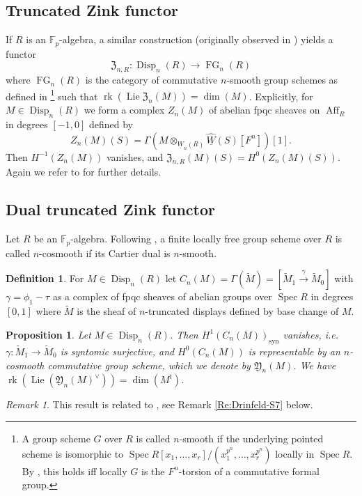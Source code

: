 \documentclass[a4paper,11pt]{amsart}
\theoremstyle{plain}
\newtheorem{Prop}[equation]{Proposition}
\theoremstyle{definition}
\newtheorem{Defn}[equation]{Definition}
\theoremstyle{remark}
\newtheorem{Remark}[equation]{Remark}
\newcommand{\bPr}{\begin{Prop}}
\newcommand{\ePr}{\end{Prop}}
\newcommand{\bDe}{\begin{Defn}}
\newcommand{\eDe}{\end{Defn}}
\newcommand{\bRe}{\begin{Remark}}
\newcommand{\eRe}{\end{Remark}}
\newcommand{\beqn}{\begin{equation}}
\newcommand{\eeqn}{\end{equation}}
\renewcommand{\u}{\underline}
\newcommand{\uM}{M} %
\numberwithin{equation}{section}
\newcommand{\FY}{\mathfrak{Y}}
\newcommand{\FZ}{\mathfrak{Z}}
\newcommand{\FF}{{\mathbb{F}}}
\DeclareMathOperator{\rk}{rk}
\DeclareMathOperator{\syn}{syn}
\DeclareMathOperator{\Aff}{Aff}
\DeclareMathOperator{\Disp}{Disp}
\DeclareMathOperator{\FG}{FG}
\DeclareMathOperator{\Lie}{Lie}
\DeclareMathOperator{\Spec}{Spec}
\begin{document}
\subsection{Truncated Zink functor}
\label{Se:Truncated-Zink-functor}

If $R$ is an $\FF_p$-algebra, a similar construction (originally observed in \cite{Lau-Zink}) yields a functor
\beqn
\label{Eq:FZnR-DispnR-LGnR}
\FZ_{n,R}\colon \Disp_n(R)\to\FG_n(R)
\eeqn
where $\FG_n(R)$ is the category of commutative $n$-smooth group schemes as defined in \cite{Drinfeld:The-Lau}\footnote{A group scheme $G$ over $R$ is called $n$-smooth if the underlying pointed scheme is isomorphic to $\Spec R[x_1,\ldots,x_r]/(x_1^{p^n},\ldots,x_r^{p^n})$ locally in $\Spec R$. By \cite[Theorem~A \& Proposition~4.3.3]{Kothari-Mundinger}, this holds iff locally $G$ is the $F^n$-torsion of a commutative formal group.} such that $\rk(\Lie\FZ_n(\uM))=\dim(\uM)$. Explicitly, for $\uM\in\Disp_n(R)$ we form a complex $Z_n(\uM)$ of abelian fpqc sheaves on $\Aff_R$ in degrees $[-1,0]$ defined by
\beqn
\label{Eq:ZnM}
Z_n(\uM)(S)=\Gamma(\uM\otimes_{\u{W\!}_n(R)}\u{\hat W}(S)[F^n])[1].
\eeqn
Then $H^{-1}(Z_n(\uM))$ vanishes, and $\FZ_{n,R}(\uM)(S)=H^0(Z_n(\uM)(S))$. Again we refer to \cite[\S11]{Lau:Gerbe} for further details.

\subsection{Dual truncated Zink functor}
\label{Se:Dual-Zink-functor}

Let $R$ be an $\FF_p$-algebra.
Following \cite{Drinfeld:The-Lau}, a finite locally free group scheme over $R$ is called $n$-cosmooth if its Cartier dual is $n$-smooth.

\bDe
\label{De:CnM}
For $\uM\in\Disp_n(R)$ let $C_n(\uM)=\Gamma(\tilde{\uM})=[\tilde M_1\xrightarrow{\gamma}\tilde M_0]$ with $\gamma=\phi_1-\tau$ as a complex of fpqc sheaves of abelian groups over $\Spec R$ in degrees $[0,1]$ where $\tilde{\uM}$ is the sheaf of $n$-truncated displays defined by base change of $\uM$.
\eDe

\bPr
\label{Pr:dual-truncated-Zink-functor}
Let $\uM\in\Disp_n(R)$.
Then $H^1(C_n(\uM))_{\syn}$ vanishes, i.e.\ $\gamma\colon\tilde M_1\to\tilde M_0$ is syntomic surjective, and $H^0(C_n(\uM))$ is representable by an $n$-cosmooth commutative group scheme, which we denote by $\FY_n(\uM)$. We have $\rk(\Lie(\FY_n(\uM)^\vee))=\dim(\uM^t)$.
\ePr

\bRe
This result is related to \cite[\S7]{Drinfeld:The-Lau}, see Remark \ref{Re:Drinfeld-S7} below.
\eRe
\end{document}
